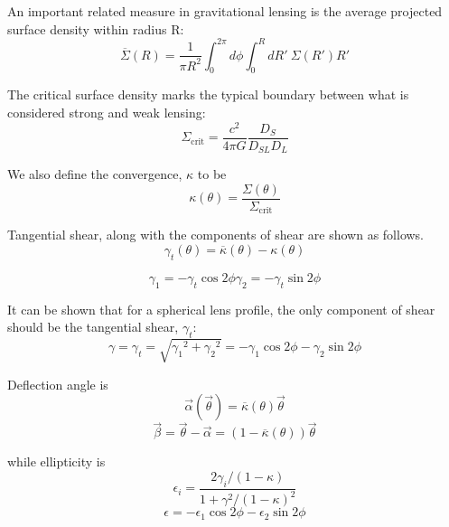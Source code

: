 \documentclass[10pt]{article}
\begin{document}
An important related measure in gravitational lensing is the average projected surface density within radius R:
\begin{equation}
\overline{\Sigma}(R) = \frac{1}{\pi R^2} \int_0^{2\pi}{d\phi \int_0^{R}{dR'~\Sigma(R')R'}}
\end{equation}

The critical surface density marks the typical boundary between what is considered strong and weak lensing:
\begin{equation}
\Sigma_\mathrm{crit} = \frac{c^2}{4\pi G} \frac{D_S}{D_{SL} D_L}
\end{equation}

We also define the convergence, $\kappa$ to be
\begin{equation}
\kappa(\theta) = \frac{\Sigma(\theta)}{\Sigma_\mathrm{crit}}
\end{equation}

Tangential shear, along with the components of shear are shown as follows.
\begin{equation}
\gamma_t(\theta) = \overline{\kappa}(\theta) - \kappa(\theta)
\end{equation}


\begin{equation}
\gamma_1 = -\gamma_t \cos{2\phi}
\gamma_2 = -\gamma_t \sin{2\phi}
\end{equation}

It can be shown that for a spherical lens profile, the only component of shear should be the tangential shear, $\gamma_t$:
\citep{Dodelson2017}
\begin{equation}
\gamma = \gamma_t = \sqrt{{\gamma_1}^2 + {\gamma_2}^2} = -\gamma_1 \cos{2\phi} -\gamma_2 \sin{2\phi}
\end{equation}

Deflection angle is
\begin{equation}
\vec{\alpha}(\vec{\theta}) = \overline{\kappa}(\theta)\vec{\theta}
\end{equation}
\begin{equation}
\vec{\beta} = \vec{\theta} - \vec{\alpha} = (1 - \overline{\kappa}(\theta))\vec{\theta}
\end{equation}

while ellipticity is
\begin{equation}
\epsilon_i = \frac{2 \gamma_i/(1 - \kappa)}{1 + \gamma^2/(1 - \kappa)^2}
\end{equation}
\begin{equation}
\epsilon =  -\epsilon_1 \cos{2\phi} -\epsilon_2 \sin{2\phi}
\end{equation}
\end{document}
